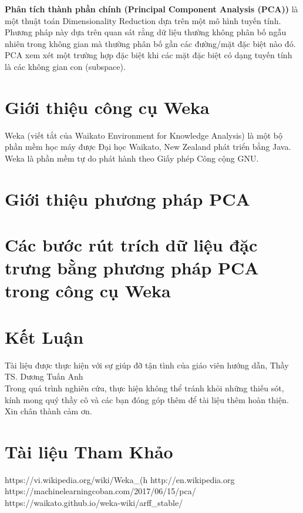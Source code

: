 \documentclass{hcmutarticle}
\begin{document}
\textbf{Phân tích thành phần chính (Principal Component Analysis (PCA))}
 là một thuật toán Dimensionality Reduction dựa trên một mô hình tuyến tính. Phương pháp này dựa trên quan sát rằng dữ liệu thường không phân bố ngẫu nhiên trong không gian mà thường phân bố gần các đường/mặt đặc biệt nào đó. PCA xem xét một trường hợp đặc biệt khi các mặt đặc biệt có dạng tuyến tính là các không gian con (subspace).

\newpage

\section{Giới thiệu công cụ Weka}\label{survey}
Weka (viết tắt của Waikato Environment for Knowledge Analysis) là một bộ phần mềm học máy được Đại học Waikato, New Zealand phát triển bằng Java. Weka là phần mềm tự do phát hành theo Giấy phép Công cộng GNU.

\section{Giới thiệu phương pháp PCA}\label{dev}

\section{Các bước rút trích dữ liệu đặc trưng bằng phương pháp PCA trong công cụ Weka}


\section{Kết Luận }\label{result}
Tài liệu được thực hiện  với sự giúp đỡ tận tình của giáo viên hướng dẫn, Thầy TS. Dương Tuấn Anh\\
Trong quá trình nghiên cứu, thực hiện không thể tránh khỏi những  thiếu sót, kính mong quý thầy  cô và các bạn đóng góp thêm để tài liệu thêm hoàn thiện.\\
Xin chân thành cảm ơn.




\section{Tài liệu Tham Khảo }




https://vi.wikipedia.org/wiki/Weka_(h%
http://en.wikipedia.org\\
https://machinelearningcoban.com/2017/06/15/pca/ \\
https://waikato.github.io/weka-wiki/arff_stable/

\end{document}

